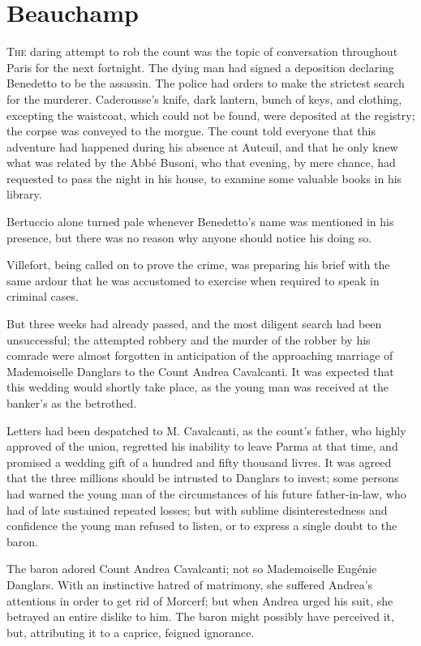\chapter{Beauchamp} 

 \lettrine{T}{he} daring attempt to rob the count was the topic of conversation throughout Paris for the next fortnight. The dying man had signed a deposition declaring Benedetto to be the assassin. The police had orders to make the strictest search for the murderer. Caderousse's knife, dark lantern, bunch of keys, and clothing, excepting the waistcoat, which could not be found, were deposited at the registry; the corpse was conveyed to the morgue. The count told everyone that this adventure had happened during his absence at Auteuil, and that he only knew what was related by the Abbé Busoni, who that evening, by mere chance, had requested to pass the night in his house, to examine some valuable books in his library. 

 Bertuccio alone turned pale whenever Benedetto's name was mentioned in his presence, but there was no reason why anyone should notice his doing so. 

 Villefort, being called on to prove the crime, was preparing his brief with the same ardour that he was accustomed to exercise when required to speak in criminal cases. 

 But three weeks had already passed, and the most diligent search had been unsuccessful; the attempted robbery and the murder of the robber by his comrade were almost forgotten in anticipation of the approaching marriage of Mademoiselle Danglars to the Count Andrea Cavalcanti. It was expected that this wedding would shortly take place, as the young man was received at the banker's as the betrothed. 

 Letters had been despatched to M. Cavalcanti, as the count's father, who highly approved of the union, regretted his inability to leave Parma at that time, and promised a wedding gift of a hundred and fifty thousand livres. It was agreed that the three millions should be intrusted to Danglars to invest; some persons had warned the young man of the circumstances of his future father-in-law, who had of late sustained repeated losses; but with sublime disinterestedness and confidence the young man refused to listen, or to express a single doubt to the baron. 

 The baron adored Count Andrea Cavalcanti; not so Mademoiselle Eugénie Danglars. With an instinctive hatred of matrimony, she suffered Andrea's attentions in order to get rid of Morcerf; but when Andrea urged his suit, she betrayed an entire dislike to him. The baron might possibly have perceived it, but, attributing it to a caprice, feigned ignorance. 

